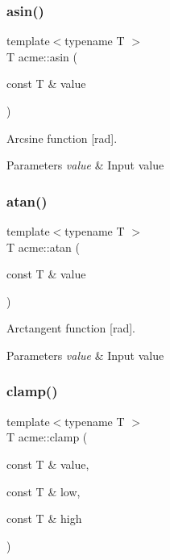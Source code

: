 \subsubsection{\texorpdfstring{asin()}{asin()}}
{\footnotesize\ttfamily template$<$typename T $>$ \\
T acme\+::asin (\begin{DoxyParamCaption}\item[{const T \&}]{value }\end{DoxyParamCaption})\hspace{0.3cm}{\ttfamily [inline]}}



Arcsine function \mbox{[}rad\mbox{]}. 


\begin{DoxyParams}{Parameters}
{\em value} & Input value \\
\hline
\end{DoxyParams}
\mbox{\label{namespaceacme_ab9d8ecb26b9bc01ea9e8906489d709bf}} 
\subsubsection{\texorpdfstring{atan()}{atan()}}
{\footnotesize\ttfamily template$<$typename T $>$ \\
T acme\+::atan (\begin{DoxyParamCaption}\item[{const T \&}]{value }\end{DoxyParamCaption})\hspace{0.3cm}{\ttfamily [inline]}}



Arctangent function \mbox{[}rad\mbox{]}. 


\begin{DoxyParams}{Parameters}
{\em value} & Input value \\
\hline
\end{DoxyParams}
\mbox{\label{namespaceacme_a51ac298ca5ccfff9b9d71bfed9253131}} 
\subsubsection{\texorpdfstring{clamp()}{clamp()}}
{\footnotesize\ttfamily template$<$typename T $>$ \\
T acme\+::clamp (\begin{DoxyParamCaption}\item[{const T \&}]{value,  }\item[{const T \&}]{low,  }\item[{const T \&}]{high }\end{DoxyParamCaption})\hspace{0.3cm}{\ttfamily [inline]}}



